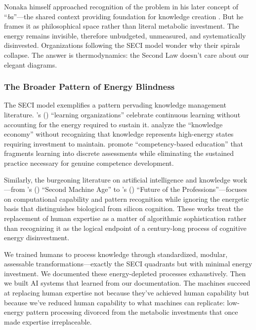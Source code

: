 Nonaka himself approached recognition of the problem in his later concept of ``\textit{ba}''---the shared context providing foundation for knowledge creation \citep{nonaka1998ba}. But he frames it as philosophical space rather than literal metabolic investment. The energy remains invisible, therefore unbudgeted, unmeasured, and systematically disinvested. Organizations following the SECI model wonder why their spirals collapse. The answer is thermodynamics: the Second Law doesn't care about our elegant diagrams.

\subsubsection{The Broader Pattern of Energy Blindness}

The SECI model exemplifies a pattern pervading knowledge management literature. \citeauthor{senge1990}'s (\citeyear{senge1990}) ``learning organizations'' celebrate continuous learning without accounting for the energy required to sustain it. \citet{powell2004knowledge} analyze the ``knowledge economy'' without recognizing that knowledge represents high-energy states requiring investment to maintain. \citet{mulder2007competency} promote ``competency-based education'' that fragments learning into discrete assessments while eliminating the sustained practice necessary for genuine competence development.

Similarly, the burgeoning literature on artificial intelligence and knowledge work---from \citeauthor{brynjolfsson2014second}'s (\citeyear{brynjolfsson2014second}) ``Second Machine Age'' to \citeauthor{susskind2020future}'s (\citeyear{susskind2020future}) ``Future of the Professions''---focuses on computational capability and pattern recognition while ignoring the energetic basis that distinguishes biological from silicon cognition. These works treat the replacement of human expertise as a matter of algorithmic sophistication rather than recognizing it as the logical endpoint of a century-long process of cognitive energy disinvestment.

We trained humans to process knowledge through standardized, modular, assessable transformations---exactly the SECI quadrants but with minimal energy investment. We documented these energy-depleted processes exhaustively. Then we built AI systems that learned from our documentation. The machines succeed at replacing human expertise not because they've achieved human capability but because we've reduced human capability to what machines can replicate: low-energy pattern processing divorced from the metabolic investments that once made expertise irreplaceable.

